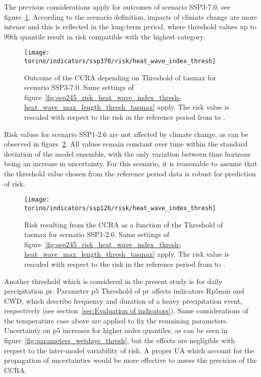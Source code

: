 The previous considerations apply for outcomes of scenario SSP3-7.0, see figure~\ref{fig:ssp370_risk_heat_wave_index_thresh-heat_wave_max_length_thresh_tasmax}. According to the scenario definition, impacts of climate change are more intense and this is reflected in the long-term period, where threshold values up to 99th quantile result in risk compatible with the highest category.

\begin{figure}
  \centering
  \texttt{[image: torino/indicators/ssp370/risk/heat\_wave\_index\_thresh]}
  \caption{Outcome of the \gls{CCRA} depending on {Threshold of \gls{tasmax}} for scenario SSP3-7.0. Same settings of figure~\ref{fig:ssp245_risk_heat_wave_index_thresh-heat_wave_max_length_thresh_tasmax} apply. The risk value is rescaled with respect to the risk in the reference period from  to .}
  \label{fig:ssp370_risk_heat_wave_index_thresh-heat_wave_max_length_thresh_tasmax}
\end{figure}

Risk values for scenario SSP1-2.6 are not affected by climate change, as can be observed in figure~\ref{fig:ssp126_risk_heat_wave_index_thresh-heat_wave_max_length_thresh_tasmax}. All values remain constant over time within the standard deviation of the model ensemble, with the only variation between time horizons being an increase in uncertainty. For this scenario, it is reasonable to assume that the threshold value chosen from the reference period data is robust for prediction of risk.

\begin{figure}
  \centering
  \texttt{[image: torino/indicators/ssp126/risk/heat\_wave\_index\_thresh]}
  \caption{Risk resulting from the \gls{CCRA} as a function of the {Threshold of \gls{tasmax}} for scenario SSP1-2.6. Same settings of figure~\ref{fig:ssp245_risk_heat_wave_index_thresh-heat_wave_max_length_thresh_tasmax} apply. The risk value is rescaled with respect to the risk in the reference period from  to .}
  \label{fig:ssp126_risk_heat_wave_index_thresh-heat_wave_max_length_thresh_tasmax}
\end{figure}

Another threshold which is considered in the present study is for daily precipitation \gls{pr}. Parameter $\mathrm{p5}$ {Threshold of \gls{pr}} affects \glspl{indicator} $\mathrm{Rp5mm}$ and $\mathrm{CWD}$, which describe frequency and duration of a heavy precipitation event, respectively (see section~\ref{sec:Evaluation of indicators}). Same considerations of the temperature case above are applied to fix the remaining parameters.
Uncertainty on $\mathrm{p5}$ increases for higher order quantiles, as can be seen in figure~\ref{fig:parameters_wetdays_thresh}, but the effects are negligible with respect to the inter-model variability of risk. A proper \gls{UA} which account for the propagation of uncertainties would be more effective to assess the precision of the \gls{CCRA}.

